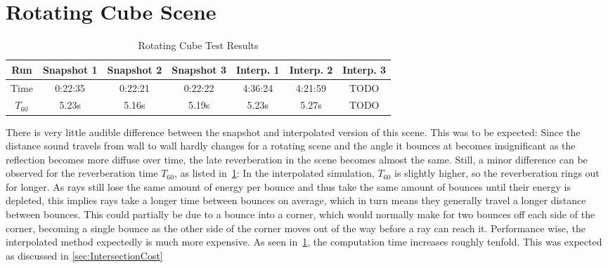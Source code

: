 \section{Rotating Cube Scene}

\begin{table}[t!]\label{tbl:CubeScene}
\centering
    \begin{tabular}{| c | c | c | c | c | c | c |}
        \hline
        Run & Snapshot 1 & Snapshot 2 & Snapshot 3 & Interp. 1 & Interp. 2 & Interp. 3 \\
        \hline
        Time & 0:22:35 & 0:22:21 & 0:22:22 & 4:36:24 & 4:21:59 & TODO \\
        \hline
        \(T_{60}\) & 5.23s & 5.16s & 5.19s & 5.23s & 5.27s & TODO \\
        \hline
    \end{tabular}
    \caption{Rotating Cube Test Results}
\end{table}
There is very little audible difference between the snapshot and interpolated version of this scene.
This was to be expected: Since the distance sound travels from wall to wall hardly changes for a rotating scene
and the angle it bounces at becomes insignificant as the reflection becomes more diffuse over time,
the late reverberation in the scene becomes almost the same.
\newline
Still, a minor difference can be observed for the reverberation time \(T_{60}\),
as listed in~\ref{tbl:CubeScene}:
In the interpolated simulation, \(T_{60}\) is slightly higher,
so the reverberation rings out for longer.
\newline
As rays still lose the same amount of energy per bounce
and thus take the same amount of bounces until their energy is depleted,
this implies rays take a longer time between bounces on average,
which in turn means they generally travel a longer distance between bounces.
\newline
This could partially be due to a bounce into a corner,
which would normally make for two bounces off each side of the corner,
becoming a single bounce as the other side of the corner moves out of the way before a ray can reach it.
\newline
Performance wise, the interpolated method expectedly is much more expensive.
As seen in~\ref{tbl:CubeScene}, the computation time increases roughly tenfold.
This was expected as discussed in \autoref{sec:IntersectionCost}

